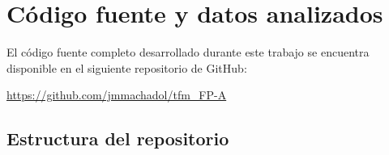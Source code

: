 \chapter{Código fuente y datos analizados}
\label{anexo:codigo}

El código fuente completo desarrollado durante este trabajo se encuentra disponible en el siguiente repositorio de GitHub:

\begin{center}
\url{https://github.com/jmmachadol/tfm_FP-A}
\end{center}

\section*{Estructura del repositorio}

